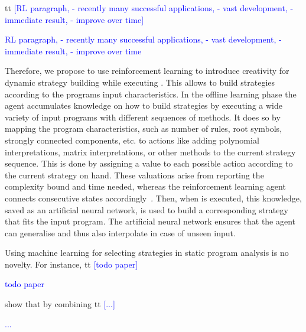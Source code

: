 \documentclass[envcountsame]{llncs}
\newcommand\MS[2][r]{\ifx t#1 \textcolor{blue}{[#2]}%
\else \begin{center}\textcolor{blue}{#2} \end{center} \fi}%
\begin{document}
\MS[t]{RL paragraph, - recently many successful applications, - vast development, - immediate result,
  - improve over time}


Therefore, we propose to use reinforcement learning to introduce creativity for dynamic strategy
building while executing \tct{}. This allows to build strategies according to the programs input
characteristics.
%
In the offline learning phase the agent accumulates knowledge on how to build strategies by
executing a wide variety of input programs with different sequences of methods. It does so by
mapping the program characteristics, such as number of rules, root symbols, strongly connected
components, etc\@. to actions like adding polynomial interpretations, matrix interpretations, or
other methods to the current strategy sequence. This is done by assigning a value to each possible
action according to the current strategy on hand. These valuations arise from reporting the
complexity bound and time needed, whereas the reinforcement learning agent connects consecutive
states accordingly~\cite{Sutton1998introduction}.
%
Then, when \tct{} is executed, this knowledge, saved as an artificial neural network, is used to
build a corresponding strategy that fits the input program. The artificial neural network ensures
that the agent can generalise and thus also interpolate in case of unseen input.

%


Using machine learning for selecting strategies in static program analysis is no novelty. For
instance, \MS[t]{todo paper} show that by combining \MS[t]{...}


\end{document}
